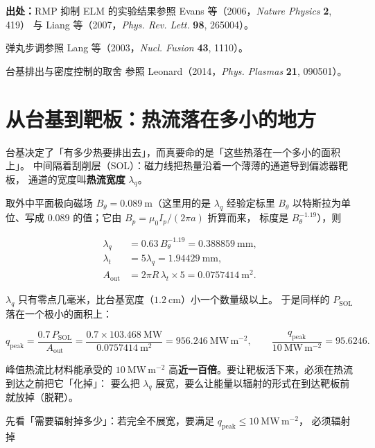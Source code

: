 {\footnotesize
\textbf{出处：}RMP 抑制 ELM 的实验结果参照 Evans 等（2006，\emph{Nature Physics} \textbf{2}, 419）
与 Liang 等（2007，\emph{Phys. Rev. Lett.} \textbf{98}, 265004）。

弹丸步调参照
Lang 等（2003，\emph{Nucl. Fusion} \textbf{43}, 1110）。

台基排出与密度控制的取舍
参照 Leonard（2014，\emph{Phys. Plasmas} \textbf{21}, 090501）。
}

\section{从台基到靶板：热流落在多小的地方}
\label{sec:app-ad-sol}

台基决定了「有多少热要排出去」，而真要命的是「这些热落在一个多小的面积上」。
中间隔着刮削层（SOL）：磁力线把热量沿着一个薄薄的通道导到偏滤器靶板，
通道的宽度叫\textbf{热流宽度} $\lambda_q$。

取外中平面极向磁场 $B_\theta=0.089\ \mathrm{m}$（这里用的是 $\lambda_q$ 经验定标里
$B_\theta$ 以特斯拉为单位、写成 $0.089$ 的值；它由 $B_p=\mu_0I_p/(2\pi a)$ 折算而来，
标度是 $B_\theta^{-1.19}$），则

\begin{equation}
\begin{aligned}
\lambda_q&=0.63\,B_\theta^{-1.19}=0.388859\ \mathrm{mm},\\
\lambda_t&=5\lambda_q=1.94429\ \mathrm{mm},\\
A_{\mathrm{out}}&=2\pi R\,\lambda_t\times5=0.0757414\ \mathrm{m^2}.
\end{aligned}
\label{eq:app-ad-lamq}
\end{equation}

$\lambda_q$ 只有零点几毫米，比台基宽度（$1.2\ \mathrm{cm}$）小一个数量级以上。
于是同样的 $P_{\mathrm{SOL}}$ 落在一个极小的面积上：

\begin{equation}
q_{\mathrm{peak}}=\frac{0.7\,P_{\mathrm{SOL}}}{A_{\mathrm{out}}}
=\frac{0.7\times103.468\ \mathrm{MW}}{0.0757414\ \mathrm{m^2}}
=956.246\ \mathrm{MW\,m^{-2}},
\qquad
\frac{q_{\mathrm{peak}}}{10\ \mathrm{MW\,m^{-2}}}=95.6246 .
\label{eq:app-ad-qpeak}
\end{equation}

峰值热流比材料能承受的 $10\ \mathrm{MW\,m^{-2}}$ 高\textbf{近一百倍}。要让靶板活下来，必须在热流到达之前把它「化掉」：
要么把 $\lambda_q$ 展宽，要么让能量以辐射的形式在到达靶板前就放掉（脱靶）。

先看「需要辐射掉多少」：若完全不展宽，要满足 $q_{\mathrm{peak}}\le10\ \mathrm{MW\,m^{-2}}$，
必须辐射掉

